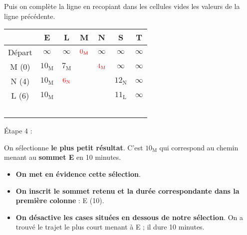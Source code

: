 Puis on complète la ligne en recopiant dans les cellules vides les valeurs de la ligne précédente.
\begin{center}
     \begin{extern}
          \begin{tabularx}{0.9\linewidth}{|c|C|C|C|C|C|C|}
               \hline
               \			&  E 						& L							& M							& N 							& S								& T  						\\ \hline
               Départ			&  $\infty$	 				& $\infty$					& $\color{red}0_{\text{M}}$	& $\infty$					& $\infty$						& $\infty$	  				\\ \hline
               M (0) 			&  $10_{\text{M}}$	 		& $7_{\text{M}}$	 			& 		& $\color{red}4_{\text{M}}$	& $\infty$						& $\infty$ 					\\ \hline
               N (4)			&  $10_{\text{M}}$	 		& $\color{red}6_{\text{N}}$	& \cellcolor{black!20}		& 		& $12_{\text{N}}$				& $\infty$ 					\\ \hline
               L (6)			&  $10_{\text{M}}$	& 		& \cellcolor{black!20}		& 		& $11_{\text{L}}$				& $\infty$ 					\\ \hline
               &  \ 	& 		& 		& 		& \				& \ 					\\
          \end{tabularx}
     \end{extern}
\end{center}
\begin{h2}\'Etape 4 :\end{h2}
On sélectionne \textbf{le plus petit résultat}. C'est \og $10_{\text{M}}$ \fg{} qui correspond au chemin menant au \textbf{sommet E} en 10 minutes.
\begin{itemize}
     \item \textbf{On met en évidence cette sélection}.
     \item \textbf{On inscrit le sommet retenu et la durée correspondante dans la première colonne} : E (10).
     \item \textbf{On désactive les cases situées en dessous de notre sélection}. On a trouvé le trajet le plus court menant à E ; il dure 10 minutes.
\end{itemize}
